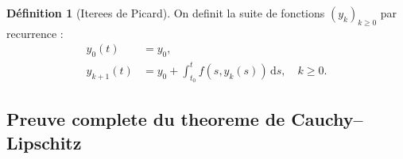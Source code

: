 \documentclass[12pt,a4paper,openany]{book}
\theoremstyle{definition}
\newtheorem{definition}{Définition}[chapter]
\theoremstyle{plain}
\theoremstyle{remark}
\newcommand{\dd}{\mathrm{d}}
\begin{document}
\begin{definition}[Iterees de Picard]\label{def:iterees-picard}
On definit la suite de fonctions $(y_k)_{k \geq 0}$ par recurrence :
\begin{align}
y_0(t) &= y_0, \label{eq:picard-init} \\
y_{k+1}(t) &= y_0 + \int_{t_0}^{t} f(s, y_k(s))\, \dd s, \quad k \geq 0. \label{eq:picard-recurrence}
\end{align}
\end{definition}

\subsection{Preuve complete du theoreme de Cauchy--Lipschitz}\label{subsec:preuve-cl}
\end{document}
